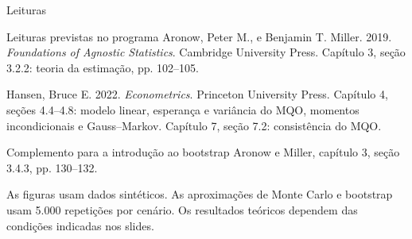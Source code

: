 \documentclass[
  ignorenonframetext,
  brazilian,
  aspectratio=169,
  10pt]{beamer}
\begin{document}
\begin{frame}{Leituras}
\protect{}\label{leituras}
\begin{block}{Leituras previstas no programa}
Aronow, Peter M., e Benjamin T. Miller. 2019.
\textit{Foundations of Agnostic Statistics}. Cambridge University Press.
Capítulo 3, seção 3.2.2: teoria da estimação, pp. 102--105.

\medskip
Hansen, Bruce E. 2022. \textit{Econometrics}. Princeton University Press.
Capítulo 4, seções 4.4--4.8: modelo linear, esperança e variância do MQO,
momentos incondicionais e Gauss--Markov.
Capítulo 7, seção 7.2: consistência do MQO.
\end{block}

\begin{block}{Complemento para a introdução ao bootstrap}
Aronow e Miller, capítulo 3, seção 3.4.3, pp. 130--132.
\end{block}

\scriptsize

As figuras usam dados sintéticos. As aproximações de Monte Carlo e
bootstrap usam 5.000 repetições por cenário. Os resultados teóricos
dependem das condições indicadas nos slides.
\end{frame}
\end{document}
